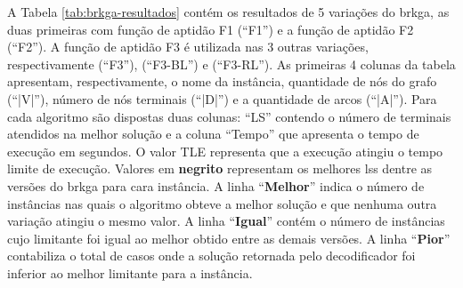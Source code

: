 A  Tabela \ref{tab:brkga-resultados}  contém  os resultados  de  5 variações  do
\gls{brkga}, as duas primeiras  com função de aptidão F1 (``F1'')  e a função de
aptidão F2 (``F2''). A função de aptidão  F3 é utilizada nas 3 outras variações,
respectivamente (``F3''), (``F3-BL'')  e (``F3-RL''). As primeiras  4 colunas da
tabela apresentam,  respectivamente, o nome  da instância, quantidade de  nós do
grafo  (``|V|''), número  de nós  terminais (``|D|'')  e a  quantidade de  arcos
(``|A|''). Para  cada algoritmo  são dispostas duas  colunas: ``LS''  contendo o
número  de terminais  atendidos  na  melhor solução  e  a  coluna ``Tempo''  que
apresenta o tempo de execução em segundos. O valor TLE representa que a execução
atingiu o tempo  limite de execução. Valores em  \textbf{negrito} representam os
melhores \gls{ls}s dentre as versões do \gls{brkga} para cara instância. A linha
``\textbf{Melhor}'' indica o número de instâncias nas quais o algoritmo obteve a
melhor  solução e  que nenhuma  outra variação  atingiu o  mesmo valor.  A linha
``\textbf{Igual}'' contém  o número  de instâncias cujo  limitante foi  igual ao
melhor obtido entre  as demais versões. A linha  ``\textbf{Pior}'' contabiliza o
total  de casos  onde a  solução retornada  pelo decodificador  foi inferior  ao
melhor limitante para a instância.

\newpage

